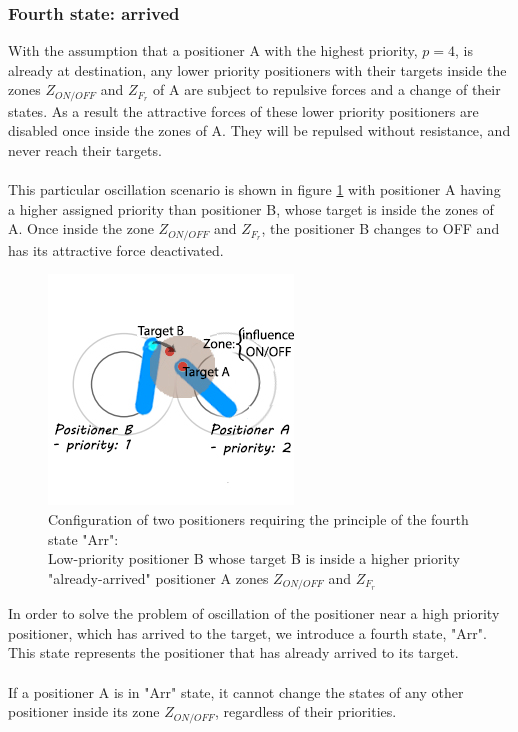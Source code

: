 \documentclass[]{spie}  %
\begin{document}
	\subsubsection{Fourth state: arrived}
	\label{sub_chap_fourth_state}
	With the assumption that a positioner A with the highest priority, $p = 4$, is already at destination, any lower priority positioners with their targets inside the zones $Z_{ON/OFF}$ and $Z_{F_{r}}$ of A are subject to repulsive forces and a change of their states. As a result the attractive forces of these lower priority positioners are disabled once inside the zones of A. They will be repulsed without resistance, and never reach their targets.\\
	\\
	This particular oscillation scenario is shown in figure \ref{fourth_state} with positioner A having a higher assigned priority than positioner B, whose target is inside the zones of A. Once inside the zone $Z_{ON/OFF}$ and $Z_{F_{r}}$, the positioner B changes to OFF and has its attractive force deactivated.
	\begin{figure}[H]
		\centering
		\includegraphics[scale=1]{images/fourth_state.jpg}
		\caption{\centering	Configuration of two positioners requiring the principle of the fourth state "Arr":\\
		Low-priority positioner B whose target B is inside a higher priority "already-arrived" positioner A zones $Z_{ON/OFF}$ and $Z_{F_{r}}$ }
		\label{fourth_state}
	\end{figure}
	In order to solve the problem of oscillation of the positioner near a high priority positioner, which has arrived to the target, we introduce a fourth state, "Arr". This state represents the positioner that has already arrived to its target. \\\\
	If a positioner A is in "Arr" state, it cannot change the states of any other positioner inside its zone $Z_{ON/OFF}$, regardless of their priorities. 
\end{document}
